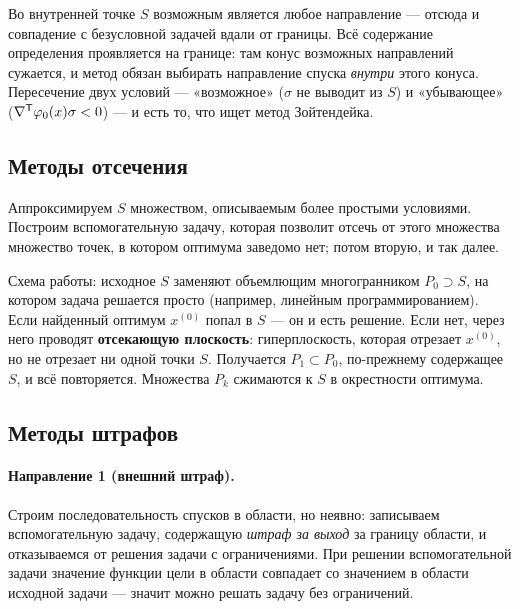 
\begin{idea}
Во внутренней точке $S$ возможным является любое направление — отсюда и
совпадение с безусловной задачей вдали от границы. Всё содержание определения
проявляется на границе: там конус возможных направлений сужается, и метод
обязан выбирать направление спуска \emph{внутри} этого конуса. Пересечение двух
условий — «возможное» ($\sigma$ не выводит из $S$) и «убывающее»
($\nabla^{\mathsf{T}}\varphi_0(x)\sigma < 0$) — и есть то, что ищет метод Зойтендейка.
\end{idea}

\subsection{Методы отсечения}

Аппроксимируем $S$ множеством, описываемым более простыми условиями. Построим
вспомогательную задачу, которая позволит отсечь от этого множества множество
точек, в котором оптимума заведомо нет; потом вторую, и так далее.


\begin{idea}
Схема работы: исходное $S$ заменяют объемлющим многогранником $P_0 \supset S$,
на котором задача решается просто (например, линейным программированием). Если
найденный оптимум $x^{(0)}$ попал в $S$ — он и есть решение. Если нет, через
него проводят \textbf{отсекающую плоскость}: гиперплоскость, которая отрезает
$x^{(0)}$, но не отрезает ни одной точки $S$. Получается $P_1 \subset P_0$,
по-прежнему содержащее $S$, и всё повторяется. Множества $P_k$ сжимаются к $S$
в окрестности оптимума.
\end{idea}

\subsection{Методы штрафов}

\paragraph{Направление 1 (внешний штраф).}
Строим последовательность спусков в области, но неявно: записываем
вспомогательную задачу, содержащую \emph{штраф за выход} за границу области, и
отказываемся от решения задачи с ограничениями. При решении вспомогательной
задачи значение функции цели в области совпадает со значением в области
исходной задачи — значит можно решать задачу без ограничений.

